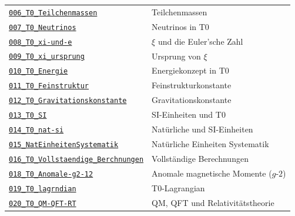 {\begin{longtable}{@{}>{\raggedright\arraybackslash}p{} >{\raggedright\arraybackslash}p{}@{}}
\href{https://github.com/jpascher/T0-Time-Mass-Duality/blob/main/2/pdf/006_T0_Teilchenmassen_De.pdf}{\texttt{006\_T0\_Teilchenmassen}} & Teilchenmassen \\
\href{https://github.com/jpascher/T0-Time-Mass-Duality/blob/main/2/pdf/007_T0_Neutrinos_De.pdf}{\texttt{007\_T0\_Neutrinos}} & Neutrinos in T0 \\
\href{https://github.com/jpascher/T0-Time-Mass-Duality/blob/main/2/pdf/008_T0_xi-und-e_De.pdf}{\texttt{008\_T0\_xi-und-e}} & $\xi$ und die Euler'sche Zahl \\
\href{https://github.com/jpascher/T0-Time-Mass-Duality/blob/main/2/pdf/009_T0_xi_ursprung_De.pdf}{\texttt{009\_T0\_xi\_ursprung}} & Ursprung von $\xi$ \\
\href{https://github.com/jpascher/T0-Time-Mass-Duality/blob/main/2/pdf/010_T0_Energie_De.pdf}{\texttt{010\_T0\_Energie}} & Energiekonzept in T0 \\
\href{https://github.com/jpascher/T0-Time-Mass-Duality/blob/main/2/pdf/011_T0_Feinstruktur_De.pdf}{\texttt{011\_T0\_Feinstruktur}} & Feinstrukturkonstante \\
\href{https://github.com/jpascher/T0-Time-Mass-Duality/blob/main/2/pdf/012_T0_Gravitationskonstante_De.pdf}{\texttt{012\_T0\_Gravitationskonstante}} & Gravitationskonstante \\
\href{https://github.com/jpascher/T0-Time-Mass-Duality/blob/main/2/pdf/013_T0_SI_De.pdf}{\texttt{013\_T0\_SI}} & SI-Einheiten und T0 \\
\href{https://github.com/jpascher/T0-Time-Mass-Duality/blob/main/2/pdf/014_T0_nat-si_De.pdf}{\texttt{014\_T0\_nat-si}} & Natürliche und SI-Einheiten \\
\href{https://github.com/jpascher/T0-Time-Mass-Duality/blob/main/2/pdf/015_NatEinheitenSystematik_De.pdf}{\texttt{015\_NatEinheitenSystematik}} & Natürliche Einheiten Systematik \\
\href{https://github.com/jpascher/T0-Time-Mass-Duality/blob/main/2/pdf/016_T0_Vollstaendige_Berchnungen_De.pdf}{\texttt{016\_T0\_Vollstaendige\_Berchnungen}} & Vollständige Berechnungen \\
\href{https://github.com/jpascher/T0-Time-Mass-Duality/blob/main/2/pdf/018_T0_Anomale-g2-12_De.pdf}{\texttt{018\_T0\_Anomale-g2-12}} & Anomale magnetische Momente ($g$-$2$) \\
\href{https://github.com/jpascher/T0-Time-Mass-Duality/blob/main/2/pdf/019_T0_lagrndian_De.pdf}{\texttt{019\_T0\_lagrndian}} & T0-Lagrangian \\
\href{https://github.com/jpascher/T0-Time-Mass-Duality/blob/main/2/pdf/020_T0_QM-QFT-RT_De.pdf}{\texttt{020\_T0\_QM-QFT-RT}} & QM, QFT und Relativitätstheorie \\

\end{longtable}}
